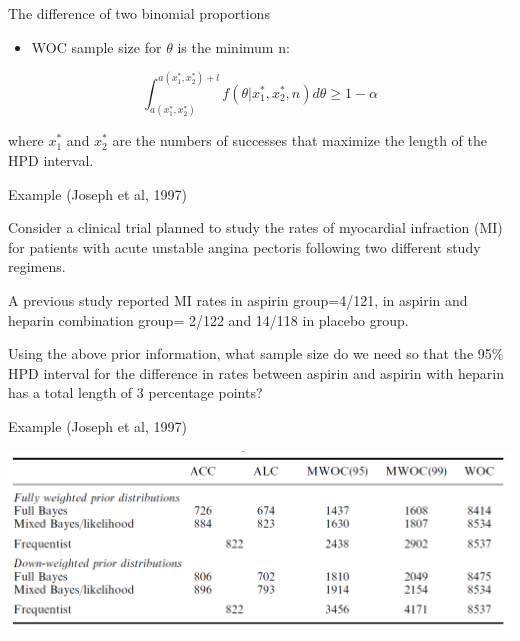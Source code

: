\documentclass{beamer}
\begin{document}
\begin{frame}{The difference of two binomial proportions}

\begin{itemize}
\itemsep1pt\parskip0pt
\item
  WOC sample size for \(\theta\) is the minimum n:
\end{itemize}

\[
\int_{a\left(x_{1}^{*},x_{2}^{*}\right)}^{a\left(x_{1}^{*},x_{2}^{*}\right)+l} f\left(\theta\vert x_{1}^{*},x_{2}^{*},n\right)d\theta \ge 1-\alpha
\]

where \(x_{1}^{*}\) and \(x_{2}^{*}\) are the numbers of successes that
maximize the length of the HPD interval.

\end{frame}




\begin{frame}{Example (Joseph et al, 1997)}

Consider a clinical trial planned to study the rates of myocardial
infraction (MI) for patients with acute unstable angina pectoris
following two different study regimens.

A previous study reported MI rates in aspirin group=4/121, in aspirin
and heparin combination group= 2/122 and 14/118 in placebo group.

Using the above prior information, what sample size do we need so that
the 95\% HPD interval for the difference in rates between aspirin and
aspirin with heparin has a total length of 3 percentage points?

\end{frame}



\begin{frame}{Example (Joseph et al, 1997)}

\includegraphics[scale=0.4]{images/Figure.png}

\end{frame}
\end{document}

